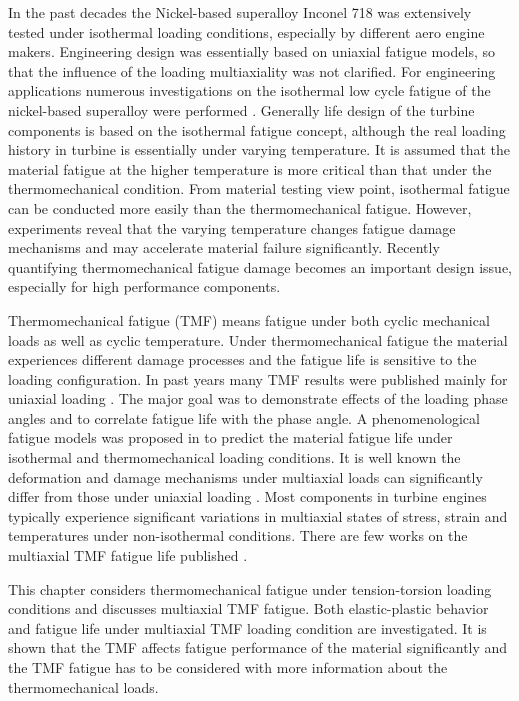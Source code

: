 In the past decades the Nickel-based superalloy Inconel 718 was extensively tested under isothermal loading conditions, especially by different aero engine makers. Engineering design was essentially based on uniaxial fatigue models, so that the influence of the loading multiaxiality was not clarified.
For engineering applications numerous investigations on the isothermal low cycle fatigue of the nickel-based superalloy were performed \cite{Koch85, Morrow88, Mahobia2014, Chen2016, William1995, kim1988elevated, nelson1992creep}.
Generally life design of the turbine components is based on the isothermal fatigue concept, although the real loading history in turbine is essentially under varying temperature. It is assumed that the material fatigue at the higher temperature is more critical than that under the thermomechanical condition. From material testing view point, isothermal fatigue can be conducted more easily than the thermomechanical fatigue. However, experiments reveal that the varying temperature changes fatigue damage mechanisms and may accelerate material failure significantly. Recently quantifying thermomechanical fatigue damage becomes an important design issue, especially for high performance components.

Thermomechanical fatigue (TMF) means fatigue under both cyclic mechanical loads as well as cyclic temperature. Under thermomechanical fatigue the material experiences different damage processes and the fatigue life is sensitive to the loading configuration. In past years many TMF results were published mainly for uniaxial loading \cite{Evans2008, Kulawinski2015, Remy2003, Bauer2009}. The major goal was to demonstrate effects of the loading phase angles and to correlate fatigue life with the phase angle. A phenomenological fatigue models was proposed  in \cite{Vose2013} to predict the material fatigue life under isothermal and thermomechanical loading conditions. It is well known the deformation and damage mechanisms under multiaxial loads can significantly differ from those under uniaxial loading \cite{Fang2015, Kang2004, Chen2004}. Most components in turbine engines typically experience significant variations in multiaxial states of stress, strain and temperatures under non-isothermal conditions. There are few works on the multiaxial TMF fatigue life published \cite{Brookes2010}.

This chapter considers thermomechanical fatigue under tension-torsion loading conditions and discusses multiaxial TMF fatigue. Both elastic-plastic behavior and fatigue life under multiaxial TMF loading condition are investigated. It is shown that the TMF affects fatigue performance of the material significantly and the TMF fatigue has to be considered with more information about the thermomechanical loads.

